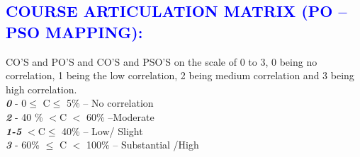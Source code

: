 \documentclass[11pt]{exam}
\begin{document}
\vspace{2.5cm}
\newpage
\textcolor{blue}{\section{\large \bfseries COURSE ARTICULATION MATRIX (PO – PSO MAPPING): }}
CO'S and PO'S and CO'S and PSO'S on the scale of 0 to 3, 0 being no correlation, 1 being the low correlation, 2 being medium correlation and 3 being high correlation.\\
\textbf{\textit{0}} - 0$\leq$ C$\leq$ 5\% – No correlation\\	\textbf{\textit{2}} - 40 \% $<$C $<$ 60\% –Moderate\\
\textbf{\textit{1-5}}  $<$C$\leq$ 40\% – Low/ Slight\\	\textbf{\textit{3}} - 60\% $\leq$ C $<$ 100\% – Substantial /High
\end{document}

